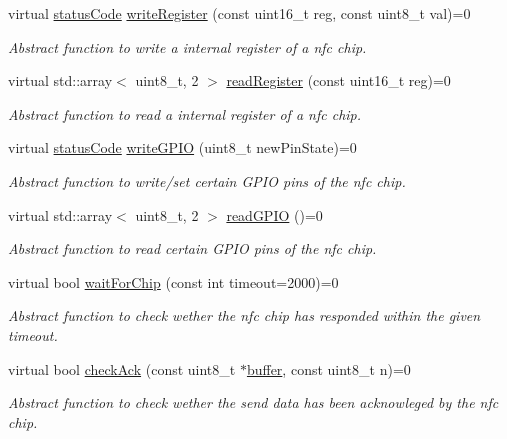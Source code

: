 \begin{DoxyCompactItemize}
virtual \hyperlink{declarations_8h_ae1d20c5a38cae82ccaa6a77be3fd264b}{status\+Code} \hyperlink{classnfc_1_1NFC_a7e0a000aadae9b545e94ba213d4ac24e}{write\+Register} (const uint16\+\_\+t reg, const uint8\+\_\+t val)=0
\begin{DoxyCompactList}\small\item\em Abstract function to write a internal register of a nfc chip. \end{DoxyCompactList}\item 
virtual std\+::array$<$ uint8\+\_\+t, 2 $>$ \hyperlink{classnfc_1_1NFC_a47da8428b5ee9011cc3f5e9cc501ce22}{read\+Register} (const uint16\+\_\+t reg)=0
\begin{DoxyCompactList}\small\item\em Abstract function to read a internal register of a nfc chip. \end{DoxyCompactList}\item 
virtual \hyperlink{declarations_8h_ae1d20c5a38cae82ccaa6a77be3fd264b}{status\+Code} \hyperlink{classnfc_1_1NFC_a606b08348cb8176a38b2dd9fc1136888}{write\+G\+P\+IO} (uint8\+\_\+t new\+Pin\+State)=0
\begin{DoxyCompactList}\small\item\em Abstract function to write/set certain G\+P\+IO pins of the nfc chip. \end{DoxyCompactList}\item 
virtual std\+::array$<$ uint8\+\_\+t, 2 $>$ \hyperlink{classnfc_1_1NFC_a2d2ccf98ac7faaa8652a69c0242e031c}{read\+G\+P\+IO} ()=0
\begin{DoxyCompactList}\small\item\em Abstract function to read certain G\+P\+IO pins of the nfc chip. \end{DoxyCompactList}\item 
virtual bool \hyperlink{classnfc_1_1NFC_a71585d021800a85b4a52a212d6313b1f}{wait\+For\+Chip} (const int timeout=2000)=0
\begin{DoxyCompactList}\small\item\em Abstract function to check wether the nfc chip has responded within the given timeout. \end{DoxyCompactList}\item 
virtual bool \hyperlink{classnfc_1_1NFC_a9d859ed12251d6d553d9f5c09bbb10ef}{check\+Ack} (const uint8\+\_\+t $\ast$\hyperlink{classbuffer}{buffer}, const uint8\+\_\+t n)=0
\begin{DoxyCompactList}\small\item\em Abstract function to check wether the send data has been acknowleged by the nfc chip. \end{DoxyCompactList}\item 

\end{DoxyCompactItemize}
